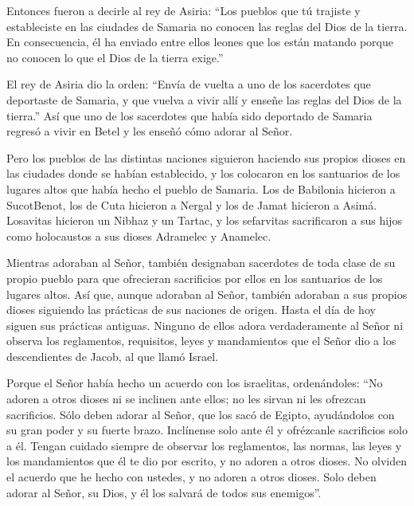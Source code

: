  Entonces fueron a decirle al rey de Asiria: ``Los pueblos
que tú trajiste y estableciste en las ciudades de Samaria no conocen las
reglas del Dios de la tierra. En consecuencia, él ha enviado entre ellos
leones que los están matando porque no conocen lo que el Dios de la
tierra exige.''

 El rey de Asiria dio la orden: ``Envía de vuelta a uno de
los sacerdotes que deportaste de Samaria, y que vuelva a vivir allí y
enseñe las reglas del Dios de la tierra.''  Así que uno de
los sacerdotes que había sido deportado de Samaria regresó a vivir en
Betel y les enseñó cómo adorar al Señor.

 Pero los pueblos de las distintas naciones siguieron
haciendo sus propios dioses en las ciudades donde se habían establecido,
y los colocaron en los santuarios de los lugares altos que había hecho
el pueblo de Samaria.  Los de Babilonia hicieron a
SucotBenot, los de Cuta hicieron a Nergal y los de Jamat hicieron a
Asimá.  Losavitas hicieron un Nibhaz y un Tartac, y los
sefarvitas sacrificaron a sus hijos como holocaustos a sus dioses
Adramelec y Anamelec.

 Mientras adoraban al Señor, también designaban sacerdotes
de toda clase de su propio pueblo para que ofrecieran sacrificios por
ellos en los santuarios de los lugares altos.  Así que,
aunque adoraban al Señor, también adoraban a sus propios dioses
siguiendo las prácticas de sus naciones de origen.  Hasta
el día de hoy siguen sus prácticas antiguas. Ninguno de ellos adora
verdaderamente al Señor ni observa los reglamentos, requisitos, leyes y
mandamientos que el Señor dio a los descendientes de Jacob, al que llamó
Israel.

 Porque el Señor había hecho un acuerdo con los israelitas,
ordenándoles: ``No adoren a otros dioses ni se inclinen ante ellos; no
les sirvan ni les ofrezcan sacrificios.  Sólo deben adorar
al Señor, que los sacó de Egipto, ayudándolos con su gran poder y su
fuerte brazo. Inclínense solo ante él y ofrézcanle sacrificios solo a
él.  Tengan cuidado siempre de observar los reglamentos,
las normas, las leyes y los mandamientos que él te dio por escrito, y no
adoren a otros dioses.  No olviden el acuerdo que he hecho
con ustedes, y no adoren a otros dioses.  Solo deben adorar
al Señor, su Dios, y él los salvará de todos sus enemigos''.

